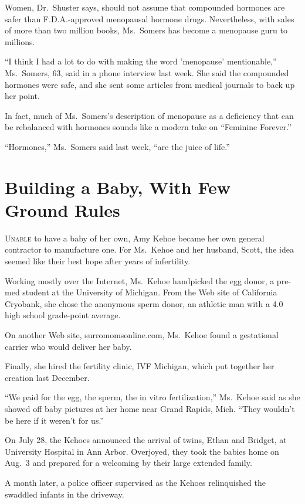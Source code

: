 ﻿\documentclass[12pt]{article}
\begin{document}
Women, Dr.~Shuster says, should not assume that compounded hormones are safer than F.D.A.-approved
menopausal hormone drugs. Nevertheless, with sales of more than two million books, Ms.~Somers has
become a menopause guru to millions.

``I think I had a lot to do with making the word 'menopause' mentionable,'' Ms.~Somers, 63, said in
a phone interview last week. She said the compounded hormones were safe, and she sent some articles
from medical journals to back up her point.

In fact, much of Ms.~Somers's description of menopause as a deficiency that can be rebalanced with
hormones sounds like a modern take on ``Feminine Forever.''

``Hormones,'' Ms.~Somers said last week, ``are the juice of life.''

\section{Building a Baby, With Few Ground Rules}

\lettrine{U}{nable} to have a baby of her own, Amy Kehoe became her own
general contractor to manufacture one. For Ms.~Kehoe and her husband, Scott, the idea seemed like
their best hope after years of infertility.

Working mostly over the Internet, Ms.~Kehoe handpicked the egg donor, a pre-med student at the
University of Michigan. From the Web site of California Cryobank, she chose the anonymous sperm
donor, an athletic man with a 4.0 high school grade-point average.

On another Web site, surromomsonline.com, Ms.~Kehoe found a gestational carrier who would deliver
her baby.

Finally, she hired the fertility clinic, IVF Michigan, which put together her creation last
December.

``We paid for the egg, the sperm, the in vitro fertilization,'' Ms.~Kehoe said as she showed off
baby pictures at her home near Grand Rapids, Mich. ``They wouldn't be here if it weren't for us.''

On July 28, the Kehoes announced the arrival of twins, Ethan and Bridget, at University Hospital in
Ann Arbor. Overjoyed, they took the babies home on Aug.~3 and prepared for a welcoming by their
large extended family.

A month later, a police officer supervised as the Kehoes relinquished the swaddled infants in the
driveway.
\end{document}
